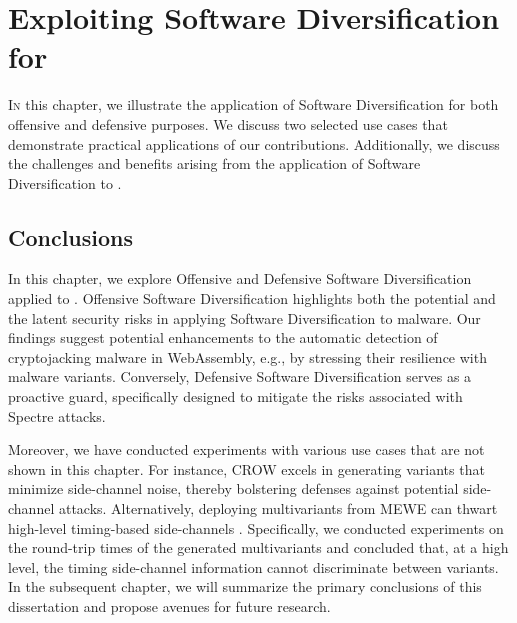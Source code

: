\chapter{Exploiting Software Diversification for \Wasm}
\label{exploit}




\vspace{12mm}

\lettrine[lines=3]{I}{n} this chapter, we illustrate the application of Software Diversification for both offensive and defensive purposes.
We discuss two selected use cases that demonstrate practical applications of our contributions.
Additionally, we discuss the challenges and benefits arising from the application of Software Diversification to \Wasm.









% 

\section*{Conclusions}
In this chapter, we explore Offensive and Defensive Software Diversification applied to \Wasm.
Offensive Software Diversification highlights both the potential and the latent security risks in applying Software Diversification to \Wasm malware. 
Our findings suggest potential enhancements to the automatic detection of cryptojacking malware in WebAssembly, e.g., by stressing their resilience with \Wasm malware variants. 
Conversely, Defensive Software Diversification serves as a proactive guard, specifically designed to mitigate the risks associated with Spectre attacks. 

Moreover, we have conducted experiments with various use cases that are not shown in this chapter.
For instance, CROW excels in generating \Wasm variants that minimize side-channel noise, thereby bolstering defenses against potential side-channel attacks. 
Alternatively, deploying multivariants from MEWE can thwart high-level timing-based side-channels \cite{morgan2015web}. 
Specifically, we conducted experiments on the round-trip times of the generated multivariants and concluded that, at a high level, the timing side-channel information cannot discriminate between variants. 
In the subsequent chapter, we will summarize the primary conclusions of this dissertation and propose avenues for future research.
